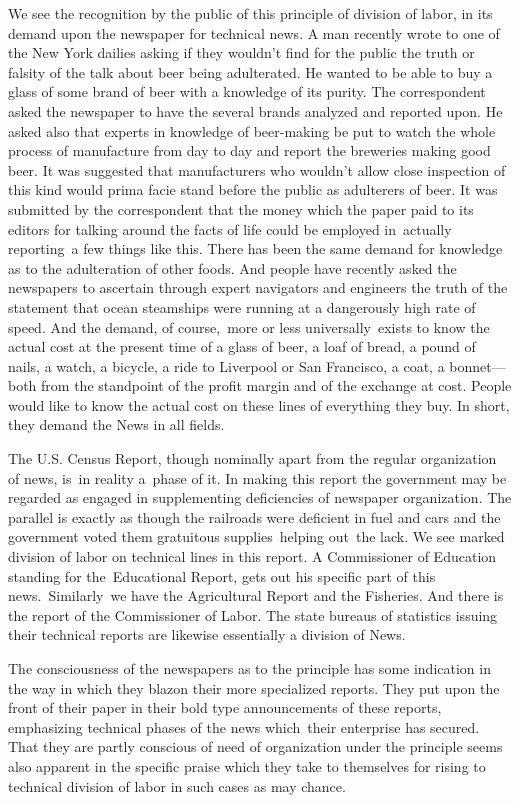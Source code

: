 \documentclass[twoside,symmetric,nobib,justified]{tufte-book}
\begin{document}
We see the recognition by the public of this principle of division of
labor, in its demand upon the newspaper for technical news. A man
recently wrote to one of the New York dailies asking if they wouldn't
find for the public the truth or falsity of the talk about beer being
adulterated. He wanted to be able to buy a glass of some brand of beer
with a knowledge of its purity. The correspondent asked the newspaper to
have the several brands analyzed and reported upon. He asked also that
experts in knowledge of beer-making be put to watch the whole process of
manufacture from day to day and report the breweries making good beer.
It was suggested that manufacturers who wouldn't allow close inspection
of this kind would prima facie stand before the public as adulterers of
beer. It was submitted by the correspondent that the money which the
paper paid to its editors for talking around the facts of life could be
employed in~actually reporting~a few things like this. There has been
the same demand for knowledge as to the adulteration of other foods. And
people have recently asked the newspapers to ascertain through expert
navigators and engineers the truth of the statement that ocean
steamships were running at a dangerously high rate of speed. And the
demand, of course,~more or less universally~exists to know the actual
cost at the present time of a glass of beer, a loaf of bread, a pound of
nails, a watch, a bicycle, a ride to Liverpool or San Francisco, a coat,
a bonnet---both from the standpoint of the profit margin and of the
exchange at cost. People would like to know the actual cost on these
lines of everything they buy. In short, they demand the News in all
fields.~

The U.S. Census Report, though nominally apart from the regular
organization of news, is~in reality a~phase of it. In making this report
the government may be regarded as engaged in supplementing deficiencies
of newspaper organization. The parallel is exactly as though the
railroads were deficient in fuel and cars and the government voted them
gratuitous supplies~helping out~the lack. We see marked division of
labor on technical lines in this report. A Commissioner of Education
standing for the~Educational Report, gets out his specific part of this
news.~Similarly~we have the Agricultural Report and the Fisheries. And
there is the report of the Commissioner of Labor. The state bureaus of
statistics issuing their technical reports are likewise essentially a
division of News.~

The consciousness of the newspapers as to the principle has some
indication in the way in which they blazon their more specialized
reports. They put upon the front of their paper in their bold type
announcements of these reports, emphasizing technical phases of the news
which~their enterprise has secured. That they are partly conscious of
need of organization under the principle seems also apparent in the
specific praise which they take to themselves for rising to technical
division of labor in such cases as may chance.~
\end{document}
